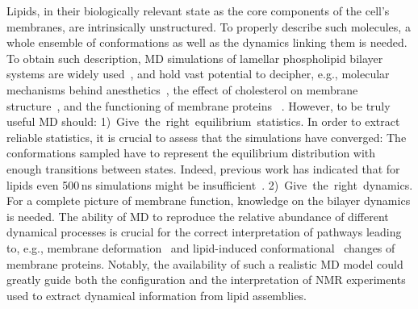 \documentclass[journal=jpcbfk,manuscript=article,layout=twocolumn]{achemso}
\begin{document}
Lipids, in their biologically relevant state as the core components of the cell's membranes, are intrinsically unstructured.
To properly describe such molecules, a whole ensemble of conformations as well as the dynamics linking them is needed.
To obtain such description, MD simulations of lamellar phospholipid bilayer systems are widely 
used~\cite{lyubartsev11,chau07,ferreira13,botan15, ferreira15,miettinen19,XXX}, and
hold vast potential to decipher, e.g., molecular mechanisms behind anesthetics~\cite{chau07,XXX}, the effect of cholesterol on membrane structure~\cite{XXX,ferreira13}, and the functioning of membrane proteins~\cite{lindahl08} .
However, to be truly useful MD should:
\mbox{1) Give the right equilibrium statistics.}
In order to extract reliable statistics, it is crucial to assess that the simulations have converged: The conformations sampled have to represent the equilibrium distribution with enough transitions between states. Indeed, previous work has indicated that for lipids even 500\,ns simulations might be insufficient~\cite{vogel12,ferreira15}.
%
\mbox{2) Give the right dynamics.}
For a complete picture of membrane function, knowledge on the bilayer dynamics is %
needed. The ability of MD to reproduce the relative abundance of different dynamical processes is crucial for the correct interpretation of pathways leading to, e.g., membrane deformation~\cite{chernomordik08} and lipid-induced conformational~\cite{gibson93,phillips09} changes of membrane proteins. Notably, the availability of such a realistic MD model could greatly guide both the configuration and the interpretation of NMR experiments used to extract dynamical information from lipid assemblies.
\end{document}
